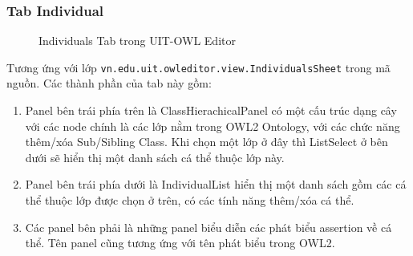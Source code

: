 \subsubsection{Tab Individual}
\begin{figure}[h!]
	\centering
	\caption{Individuals Tab trong UIT-OWL Editor\label{overflow}}
\end{figure}
Tương ứng với lớp \verb|vn.edu.uit.owleditor.view.IndividualsSheet| trong mã nguồn. Các thành phần của tab này gồm:
\begin{enumerate}
	\item Panel bên trái phía trên là ClassHierachicalPanel có một cấu trúc dạng cây với các node chính là các lớp nằm trong OWL2 Ontology, với các chức năng thêm/xóa Sub/Sibling Class. Khi chọn một lớp ở đây thì ListSelect ở bên dưới sẽ hiển thị một danh sách cá thể thuộc lớp này.
	\item Panel bên trái phía dưới là IndividualList hiển thị một danh sách gồm các cá thể thuộc lớp được chọn ở trên, có các tính năng thêm/xóa cá thể.
	\item Các panel bên phải là những panel biểu diễn các phát biểu assertion về cá thể. Tên panel cũng tương ứng với tên phát biểu trong OWL2.
\end{enumerate}

